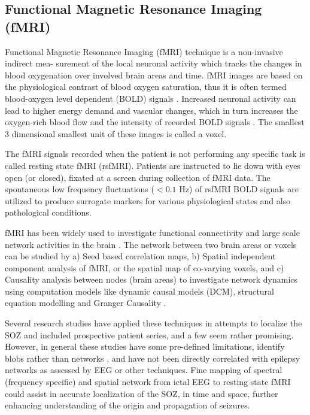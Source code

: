 \subsection{Functional Magnetic Resonance Imaging (fMRI)}
Functional Magnetic Resonance Imaging (fMRI) technique is a non-invasive indirect mea- surement of the local neuronal activity which tracks the changes in blood oxygenation over involved brain areas and time. fMRI images are based on the physiological contrast of blood oxygen saturation, thus it is often termed blood-oxygen level dependent (BOLD) signals \citep{ogawa1990oxygenation}. Increased neuronal activity can lead to higher energy demand and vascular changes, which in turn increases the oxygen-rich blood flow and the intensity of recorded BOLD signals \citep{huettel2004functional}. The smallest 3 dimensional smallest unit of these images is called a voxel.

The fMRI signals recorded when the patient is not performing any specific task is called resting state fMRI (rsfMRI). Patients are instructed to lie down with eyes open (or closed), fixated at a screen during collection of fMRI data. The spontaneous low frequency fluctuations ($< 0.1$ Hz) of rsfMRI BOLD signals are utilized to produce surrogate markers for various physiological states and also pathological conditions.

fMRI has been widely used to investigate functional connectivity and large scale network activities in the brain \citep{fox2007spontaneous}. The network between two brain areas or voxels can be studied by a) Seed based correlation maps, b) Spatial independent component analysis of fMRI, or the spatial map of co-varying voxels, and c) Causality analysis between nodes (brain areas) to investigate network dynamics using computation models like dynamic causal models (DCM), structural equation modelling and Granger Causality \citep{centeno2014network}. 

Several research studies have applied these techniques in attempts to localize the SOZ and included prospective patient series, and a few seem rather promising.  However, in general these studies have some pre-defined limitations, identify blobs rather than networks \citep{shah2019characterizing, boerwinkle2017correlating, gil2020beyond, hunyadi2013ica, zhang2015lateralization}, and have not been directly correlated with epilepsy networks as assessed by EEG or other techniques. Fine mapping of spectral (frequency specific) and spatial network from ictal EEG to resting state fMRI could assist in accurate localization of the SOZ, in time and space, further enhancing understanding of the origin and propagation of seizures.
 
